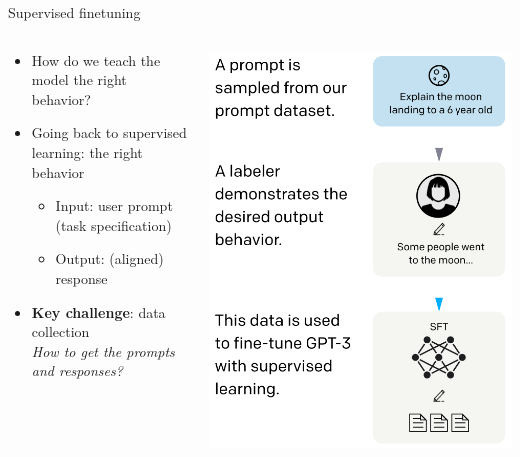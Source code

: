 \documentclass[usenames,dvipsnames,notes,11pt,aspectratio=169,hyperref={colorlinks=true, linkcolor=blue}]{beamer}
\begin{document}
\begin{frame}
    {Supervised finetuning}
    \begin{columns}
        \begin{column}{0.6\textwidth}
            \begin{itemize}
                \itemsep1em
                \item How do we teach the model the right behavior?  
                \item Going back to supervised learning:  the right behavior
                    \begin{itemize}
                        \item Input: user prompt (task specification)
                        \item Output: (aligned) response
                    \end{itemize}
                \item {\bf Key challenge}: {data collection} \\
                    {\em How to get the prompts and responses?}

            \end{itemize}
        \end{column}
        \begin{column}{0.4\textwidth}
        \includegraphics[width=\textwidth]{figures/sft}
        \end{column}
    \end{columns}
\end{frame}
\end{document}

